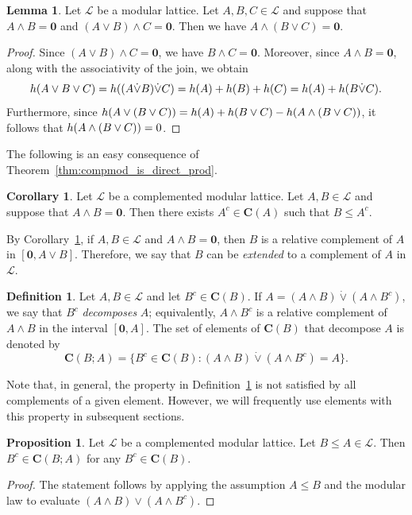 \documentclass[a4paper,11pt,reqno]{article}
\theoremstyle{definition}
\newtheorem{definition}[theorem]{{{Definition}}}
\newtheorem{corollary}[theorem]{{{Corollary}}}
\newtheorem{proposition}[theorem]{{{Proposition}}}
\newtheorem{lemma}[theorem]{{{Lemma}}}
\newcommand{\mL}{\mathcal{L}}
\newcommand{\zero}{{\mathbf{0}}}
\begin{document}
\begin{lemma}\label{lem:dir_join_assoc}
    Let $\mL$ be a modular lattice.
    Let $A,B,C\in\mathcal{L}$ and suppose that $A\wedge B=\zero$ and $(A\vee B)\wedge C=\zero$. Then we have $A\wedge(B\vee C)=\zero$. 
\end{lemma}
\begin{proof}
    Since $(A\vee B)\wedge C=\zero$, we have $B\wedge C=\zero$. Moreover, since $A\wedge B=\zero$, along with the associativity of the join, we obtain  
    $$\textup{h}( A\vee B\vee C)=\textup{h}((A\dot\vee B)\dot\vee C)=\textup{h}(A)+\textup{h}(B)+\textup{h}(C)=\textup{h}(A)+\textup{h}(B\dot\vee C).$$
    Furthermore, since $\textup{h}(A\vee(B\vee C))=\textup{h}(A)+\textup{h}(B\vee C)-\textup{h}(A\wedge(B\vee C))$, it follows that $\textup{h}(A\wedge(B\vee C))=0$. 
\end{proof}

The following is an easy consequence of Theorem~\ref{thm:compmod_is_direct_prod}.
\begin{corollary}\label{cor:extend_to_complement}
    Let $\mL$ be a complemented modular lattice.
    Let $A,B\in\mathcal{L}$ and suppose that $A\wedge B=\zero$. Then there exists $A^c\in\mathbf{C}(A)$ such that $B\leq A^c$.
\end{corollary}

By Corollary~\ref{cor:extend_to_complement}, if $A,B\in\mathcal{L}$ and $A\wedge B=\zero$, then $B$ is a relative complement of $A$ in $[\zero,A \vee B]$. Therefore, we say that $B$ can be {\em extended} to a complement of $A$ in $\mL$.

\begin{definition}\label{def:decomposes}
    Let $A,B\in\mathcal{L}$ and let $B^c\in \mathbf{C}(B)$. 
    If $A=(A\wedge B)\dot\vee(A\wedge B^c)$, we say that $B^c$ \emph{decomposes} $A$; equivalently, $A\wedge B^c$ is a relative complement of $A\wedge B$ in the interval $[\zero,A]$.
    The set of elements of $\mathbf{C}(B)$ that decompose $A$ is denoted by 
    $$\mathbf{C}(B;A)=\{ B^c \in \mathbf{C}(B) : (A\wedge B) \dot\vee (A \wedge B^c) = A \}.$$ 
\end{definition}

Note that, in general, the property in Definition~\ref{def:decomposes} is not satisfied by all complements of a given element. However, we will frequently use elements with this property in subsequent sections.

\begin{proposition}\label{prop:compdecomp}
    Let $\mL$ be a complemented modular lattice.
    Let $B\leq A\in\mathcal{L}$. Then $B^c\in\mathbf{C}(B;A)$ for any $B^c\in \mathbf{C}(B)$.
\end{proposition}
\begin{proof}
    The statement follows by applying the assumption $A\leq B$ and the modular law to evaluate $(A\wedge B)\vee (A\wedge B^c)$.
\end{proof}
\end{document}
